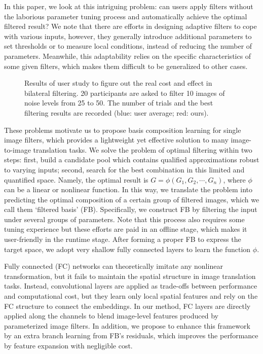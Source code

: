 \documentclass[twocolumn]{svjour3}          %
\begin{document}
In this paper, we look at this intriguing problem: can users apply filters without the laborious parameter tuning process and automatically achieve the optimal filtered result? We note that there are efforts in designing adaptive filters \cite{Foi2007,Jeon2016,fil_denoise,median_adaptive,cvpr/YinGQ19,aaai/LiuZLHY020} to cope with various inputs, however, they generally introduce additional parameters to set thresholds or to measure local conditions, instead of reducing the number of parameters. Meanwhile, this adaptability relies on the specific characteristics of some given filters, which makes them difficult to be generalized to other cases.
\begin{figure}[t]
	\centering
	\caption{Results of user study to figure out the real cost and effect in bilateral filtering. 20 participants are asked to filter 10 images of noise levels from 25 to 50. The number of trials and the best filtering results are recorded  (blue: user average; red: ours). }
	\label{userHist}
\end{figure}
These problems motivate us to propose basis composition learning for single image filters, which provides a lightweight yet effective solution to many image-to-image translation tasks. We solve the problem of optimal filtering within two steps: first, build a candidate pool which contains qualified approximations robust to varying inputs; second, search for the best combination in this limited and quantified space. Namely, the optimal result is $G = \phi\left(G_{1},G_{2},\cdots,G_{n}\right)$, where $\phi$ can be a linear or nonlinear function. In this way, we translate the problem into predicting the optimal composition of a certain group of filtered images, which we call them `filtered basis' (FB). Specifically, we construct FB by filtering the input under several groups of parameters. Note that this process also requires some tuning experience but these efforts are paid in an offline stage, which makes it user-friendly in the runtime stage. After forming a proper FB to express the target space, we adopt very shallow fully connected layers to learn the function $\phi$.

Fully connected (FC) networks can theoretically imitate any nonlinear transformation, but it fails to maintain the spatial structure in image translation tasks. Instead, convolutional layers are applied as trade-offs between performance and computational cost, but they learn only local spatial features and rely on the FC structure to connect the embeddings. In our method, FC layers are directly applied along the channels to blend image-level features produced by parameterized image filters. In addition, we propose to enhance this framework by an extra branch learning from FB's residuals, which improves the performance by feature expansion with negligible cost.
\end{document}
